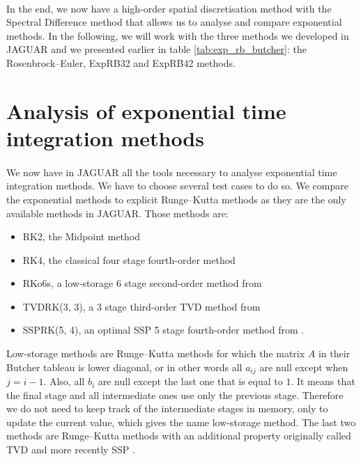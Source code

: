     \paragraph{}
    In the end, we now have a high-order spatial discretisation method with the Spectral Difference method that allows us to analyse and compare exponential methods.
    In the following, we will work with the three methods we developed in JAGUAR and we presented earlier in table \ref{tab:exp_rb_butcher}: the Rosenbrock--Euler, ExpRB32 and ExpRB42 methods.


  \section{Analysis of exponential time integration methods}

    \paragraph{}
    We now have in JAGUAR all the tools necessary to analyse exponential time integration methods.
    We have to choose several test cases to do so.
    We compare the exponential methods to explicit Runge--Kutta methods as they are the only available methods in JAGUAR.
    Those methods are:
    \begin{itemize}
      \item RK2, the Midpoint method
      \item RK4, the classical four stage fourth-order method
      \item RKo6s, a low-storage 6 stage second-order method from \cite{BogeyBailly2004}
      \item TVDRK(3, 3), a 3 stage third-order TVD method from \cite{ShuOsher1988, GottliebShu1996}
      \item SSPRK(5, 4), an optimal SSP 5 stage fourth-order method from \cite{SpiteriRuuth2002}.
    \end{itemize}
    Low-storage methods are Runge--Kutta methods for which the matrix $A$ in their Butcher tableau is lower diagonal, or in other words all $a_{ij}$ are null except when $j = i - 1$.
    Also, all $b_i$ are null except the last one that is equal to $1$.
    It means that the final stage and all intermediate ones use only the previous stage.
    Therefore we do not need to keep track of the intermediate stages in memory, only to update the current value, which gives the name low-storage method.
    The last two methods are Runge--Kutta methods with an additional property originally called TVD \cite{GottliebShu1996} and more recently SSP  \cite{GottliebShuTadmor2001}.
